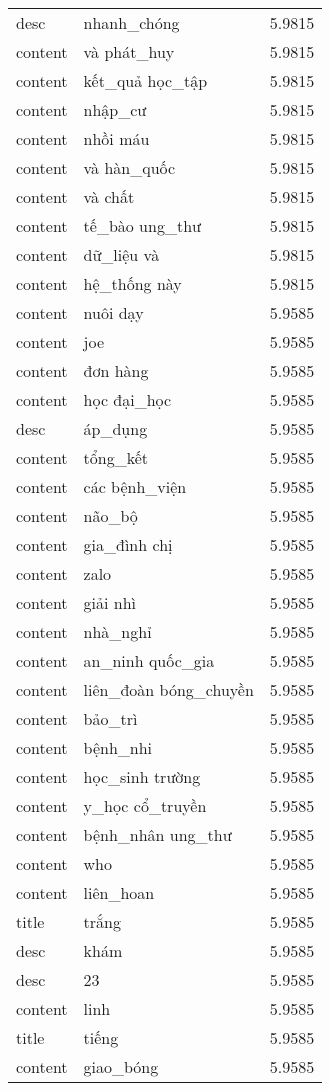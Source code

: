 \documentclass{article}
\begin{document}
\begin{tabular}{lll}
desc & nhanh\_chóng & 5.9815\\
content & và phát\_huy & 5.9815\\
content & kết\_quả học\_tập & 5.9815\\
content & nhập\_cư & 5.9815\\
content & nhồi máu & 5.9815\\
content & và hàn\_quốc & 5.9815\\
content & và chất & 5.9815\\
content & tế\_bào ung\_thư & 5.9815\\
content & dữ\_liệu và & 5.9815\\
content & hệ\_thống này & 5.9815\\
content & nuôi dạy & 5.9585\\
content & joe & 5.9585\\
content & đơn hàng & 5.9585\\
content & học đại\_học & 5.9585\\
desc & áp\_dụng & 5.9585\\
content & tổng\_kết & 5.9585\\
content & các bệnh\_viện & 5.9585\\
content & não\_bộ & 5.9585\\
content & gia\_đình chị & 5.9585\\
content & zalo & 5.9585\\
content & giải nhì & 5.9585\\
content & nhà\_nghỉ & 5.9585\\
content & an\_ninh quốc\_gia & 5.9585\\
content & liên\_đoàn bóng\_chuyền & 5.9585\\
content & bảo\_trì & 5.9585\\
content & bệnh\_nhi & 5.9585\\
content & học\_sinh trường & 5.9585\\
content & y\_học cổ\_truyền & 5.9585\\
content & bệnh\_nhân ung\_thư & 5.9585\\
content & who & 5.9585\\
content & liên\_hoan & 5.9585\\
title & trắng & 5.9585\\
desc & khám & 5.9585\\
desc & 23 & 5.9585\\
content & linh & 5.9585\\
title & tiếng & 5.9585\\
content & giao\_bóng & 5.9585\\

\end{tabular}
\end{document}
